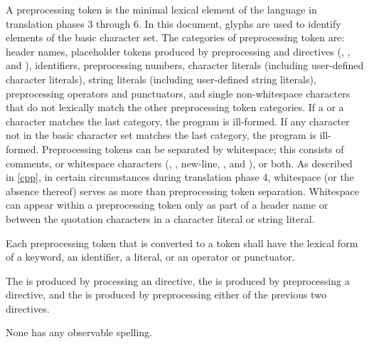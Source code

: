 \pnum
A preprocessing token is the minimal lexical element of the language in translation
phases 3 through 6.
In this document,
glyphs are used to identify
elements of the basic character set.
The categories of preprocessing token are: header names,
placeholder tokens produced by preprocessing  and  directives
(, , and ),
identifiers, preprocessing numbers, character literals (including user-defined character
literals), string literals (including user-defined string literals), preprocessing
operators and punctuators, and single non-whitespace characters that do not lexically
match the other preprocessing token categories.
If a  or a  character
matches the last category, the program is ill-formed.
If any character not in the basic character set matches the last category,
the program is ill-formed.
Preprocessing tokens can be separated by
%
whitespace;
%
this consists of comments, or whitespace characters
(,
,
new-line,
, and
), or both.
As described in \ref{cpp}, in certain
circumstances during translation phase 4, whitespace (or the absence
thereof) serves as more than preprocessing token separation. Whitespace
can appear within a preprocessing token only as part of a header name or
between the quotation characters in a character literal or
string literal.

\pnum
Each preprocessing token that is converted to a token
shall have the lexical form of a keyword, an identifier, a literal,
or an operator or punctuator.

\pnum
The  is produced
by processing an  directive,
the  is produced
by preprocessing a  directive, and
the  is produced
by preprocessing either of the previous two directives.
\begin{note}
None has any observable spelling.
\end{note}

